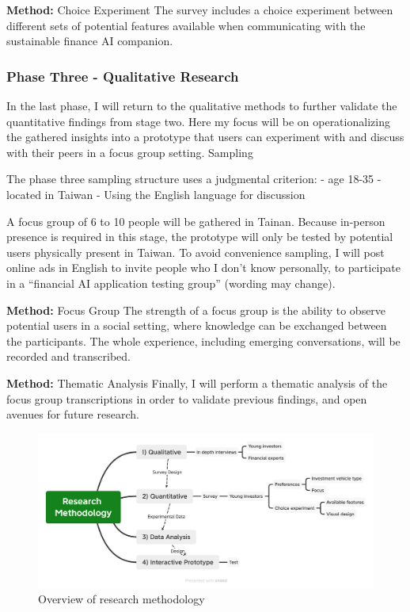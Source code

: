 \documentclass[
  letterpaper,
  DIV=11,
  numbers=noendperiod]{scrartcl}
\begin{document}
\textbf{Method:} Choice Experiment The survey includes a choice
experiment between different sets of potential features available when
communicating with the sustainable finance AI companion.

\subsubsection{Phase Three - Qualitative
Research}\label{phase-three---qualitative-research}

In the last phase, I will return to the qualitative methods to further
validate the quantitative findings from stage two. Here my focus will be
on operationalizing the gathered insights into a prototype that users
can experiment with and discuss with their peers in a focus group
setting. Sampling

The phase three sampling structure uses a judgmental criterion: - age
18-35 - located in Taiwan - Using the English language for discussion

A focus group of 6 to 10 people will be gathered in Tainan. Because
in-person presence is required in this stage, the prototype will only be
tested by potential users physically present in Taiwan. To avoid
convenience sampling, I will post online ads in English to invite people
who I don't know personally, to participate in a ``financial AI
application testing group'' (wording may change).

\textbf{Method:} Focus Group The strength of a focus group is the
ability to observe potential users in a social setting, where knowledge
can be exchanged between the participants. The whole experience,
including emerging conversations, will be recorded and transcribed.

\textbf{Method:} Thematic Analysis Finally, I will perform a thematic
analysis of the focus group transcriptions in order to validate previous
findings, and open avenues for future research.

\begin{figure}[H]

{\centering \includegraphics[width=1\linewidth,height=\textheight,keepaspectratio]{./images/methodology/research-methodology.png}

}

\caption{Overview of research methodology}

\end{figure}%
\end{document}

